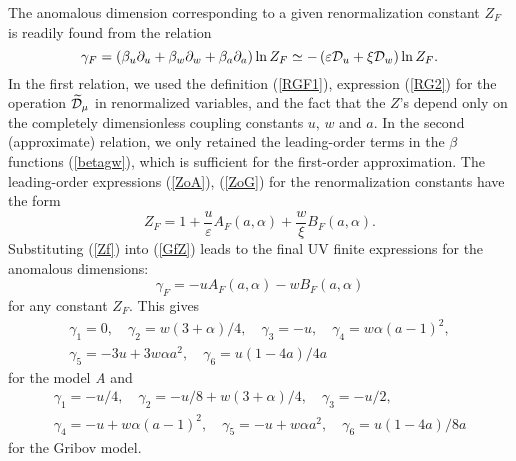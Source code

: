 \documentclass[12pt]{iopart}
\def\Dm{\widetilde{\cal D}_{\mu}}
\def\D{{\cal D}}
\begin{document}
The anomalous dimension corresponding to a given renormalization constant
$Z_{F}$ is readily found from the relation
\begin{equation}
\gamma_{F} = \left( \beta_{u}\partial_{u}+\beta_{w}\partial_{w}
+\beta_{a}\partial_{a} \right)
\ln Z_{F} \simeq  - \left(\varepsilon\D_{u}+\xi\D_{w}\right) \ln Z_{F}.
\label{GfZ}
\end{equation}
In the first relation, we used the definition (\ref{RGF1}), expression
(\ref{RG2}) for the operation $\Dm$ in renormalized variables, and the
fact that the $Z$'s depend only on the completely dimensionless coupling
constants $u$, $w$ and $a$. In the second (approximate) relation, we only
retained the leading-order terms in the $\beta$ functions (\ref{betagw}),
which is sufficient for the first-order approximation. The leading-order
expressions (\ref{ZoA}), (\ref{ZoG}) for the renormalization constants have
the form
\begin{equation}
Z_{F} = 1 + \frac{u}{\varepsilon} A_{F}(a,\alpha) + \frac{w}{\xi} B_{F}(a,\alpha).
\label{Zf}
\end{equation}
Substituting (\ref{Zf}) into (\ref{GfZ}) leads to the final UV finite
expressions for the anomalous dimensions:
\begin{equation}
\gamma_{F} = - u A_{F}(a,\alpha) - w B_{F}(a,\alpha)
\label{gift}
\end{equation}
for any constant $Z_{F}$. This gives
\begin{eqnarray}
\gamma_{1} = 0, \quad \gamma_{2} = w (3+\alpha)/4, \quad
\gamma_{3} = -u , \quad \gamma_{4} =w \alpha (a-1)^{2} , \nonumber \\
\gamma_{5} =  -3u +3 w \alpha a^{2}, \quad
\gamma_{6} =u(1-4a)/4a
\label{anomA}
\end{eqnarray}
for the model {\it A} and
\begin{eqnarray}
\gamma_{1} = -u/4 , \quad \gamma_{2} = -u/8 + w (3+\alpha)/4, \quad
\gamma_{3} = -u/2 , \nonumber \\
\gamma_{4} = -u + w \alpha (a-1)^{2}, \quad
\gamma_{5} = -u + w \alpha a^{2}, \quad
\gamma_{6} =u(1-4a)/8a
\label{anomG}
\end{eqnarray}
for the Gribov model.
\end{document}
